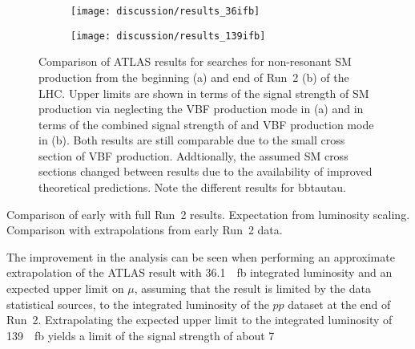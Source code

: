 \begin{figure}[htbp]
  \centering

  \begin{subfigure}{0.53\textwidth}
    \texttt{[image: discussion/results\_36ifb]}
  \end{subfigure}\hfill%
  \begin{subfigure}{0.45\textwidth}
    \texttt{[image: discussion/results\_139ifb]}
  \end{subfigure}

  \caption{Comparison of ATLAS results for searches for non-resonant
    SM \HH production from the beginning (a) and end of Run~2 (b) of
    the LHC. Upper limits are shown in terms of the signal strength of
    SM \HH production via \ggF neglecting the VBF production mode in
    (a) and in terms of the combined signal strength of \ggF and VBF
    production mode in (b). Both results are still comparable due to
    the small cross section of VBF \HH production. Addtionally, the
    assumed SM \HH cross sections changed between results due to the
    availability of improved theoretical predictions.  Note the
    different results for bbtautau. }
  \label{fig:atlas_run2_hh_results}
\end{figure}

Comparison of early with full Run~2 results. Expectation from
luminosity scaling. Comparison with extrapolations from early Run~2
data.

The improvement in the analysis can be seen when performing an
approximate extrapolation of the ATLAS result with
\SI{36.1}{\per\femto\barn} integrated luminosity and an expected upper
limit on $\mu$, assuming that the result is limited by the data
statistical sources, to the integrated luminosity of the $pp$ dataset
at the end of Run~2. Extrapolating the expected upper limit to the
integrated luminosity of \SI{139}{\per\femto\barn} yields a limit of
the signal strength of about 7



